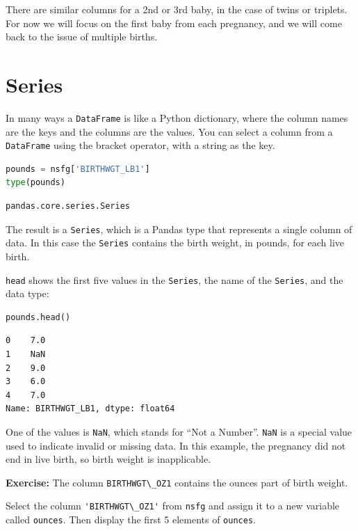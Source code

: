 There are similar columns for a 2nd or 3rd baby, in the case of twins or
triplets. For now we will focus on the first baby from each pregnancy,
and we will come back to the issue of multiple births.

\section{Series}\label{series}

In many ways a \passthrough{\lstinline!DataFrame!} is like a Python
dictionary, where the column names are the keys and the columns are the
values. You can select a column from a
\passthrough{\lstinline!DataFrame!} using the bracket operator, with a
string as the key.

\begin{lstlisting}[language=Python,style=source]
pounds = nsfg['BIRTHWGT_LB1']
type(pounds)
\end{lstlisting}

\begin{lstlisting}[style=output]
pandas.core.series.Series
\end{lstlisting}

The result is a \passthrough{\lstinline!Series!}, which is a Pandas type
that represents a single column of data. In this case the
\passthrough{\lstinline!Series!} contains the birth weight, in pounds,
for each live birth.

\passthrough{\lstinline!head!} shows the first five values in the
\passthrough{\lstinline!Series!}, the name of the
\passthrough{\lstinline!Series!}, and the data type:

\begin{lstlisting}[language=Python,style=source]
pounds.head()
\end{lstlisting}

\begin{lstlisting}[style=output]
0    7.0
1    NaN
2    9.0
3    6.0
4    7.0
Name: BIRTHWGT_LB1, dtype: float64
\end{lstlisting}

One of the values is \passthrough{\lstinline!NaN!}, which stands for
``Not a Number''. \passthrough{\lstinline!NaN!} is a special value used
to indicate invalid or missing data. In this example, the pregnancy did
not end in live birth, so birth weight is inapplicable.

\textbf{Exercise:} The column \passthrough{\lstinline!BIRTHWGT\_OZ1!}
contains the ounces part of birth weight.

Select the column \passthrough{\lstinline!'BIRTHWGT\_OZ1'!} from
\passthrough{\lstinline!nsfg!} and assign it to a new variable called
\passthrough{\lstinline!ounces!}. Then display the first 5 elements of
\passthrough{\lstinline!ounces!}.

